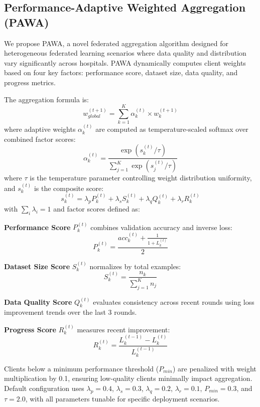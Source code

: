 \documentclass[conference]{IEEEtran}
\begin{document}
\subsection{Performance-Adaptive Weighted Aggregation (PAWA)}
We propose PAWA, a novel federated aggregation algorithm designed for heterogeneous federated learning scenarios where data quality and distribution vary significantly across hospitals. PAWA dynamically computes client weights based on four key factors: performance score, dataset size, data quality, and progress metrics.

The aggregation formula is:
%
\begin{equation}
w_{global}^{(t+1)} = \sum_{k=1}^{K} \alpha_k^{(t)} \times w_k^{(t+1)}
\end{equation}
%
where adaptive weights $\alpha_k^{(t)}$ are computed as temperature-scaled softmax over combined factor scores:
%
\begin{equation}
\alpha_k^{(t)} = \frac{\exp(s_k^{(t)} / \tau)}{\sum_{j=1}^{K} \exp(s_j^{(t)} / \tau)}
\end{equation}
%
where $\tau$ is the temperature parameter controlling weight distribution uniformity, and $s_k^{(t)}$ is the composite score:
%
\begin{equation}
s_k^{(t)} = \lambda_p P_k^{(t)} + \lambda_s S_k^{(t)} + \lambda_q Q_k^{(t)} + \lambda_r R_k^{(t)}
\end{equation}
%
with $\sum_{i} \lambda_i = 1$ and factor scores defined as:

\textbf{Performance Score} $P_k^{(t)}$ combines validation accuracy and inverse loss:
%
\begin{equation}
P_k^{(t)} = \frac{acc_k^{(t)} + \frac{1}{1 + L_k^{(t)}}}{2}
\end{equation}

\textbf{Dataset Size Score} $S_k^{(t)}$ normalizes by total examples:
%
\begin{equation}
S_k^{(t)} = \frac{n_k}{\sum_{j=1}^{K} n_j}
\end{equation}

\textbf{Data Quality Score} $Q_k^{(t)}$ evaluates consistency across recent rounds using loss improvement trends over the last 3 rounds.

\textbf{Progress Score} $R_k^{(t)}$ measures recent improvement:
%
\begin{equation}
R_k^{(t)} = \frac{L_k^{(t-1)} - L_k^{(t)}}{L_k^{(t-1)}}
\end{equation}

Clients below a minimum performance threshold ($P_{min}$) are penalized with weight multiplication by 0.1, ensuring low-quality clients minimally impact aggregation. Default configuration uses $\lambda_p = 0.4$, $\lambda_s = 0.3$, $\lambda_q = 0.2$, $\lambda_r = 0.1$, $P_{min} = 0.3$, and $\tau = 2.0$, with all parameters tunable for specific deployment scenarios.
\end{document}
